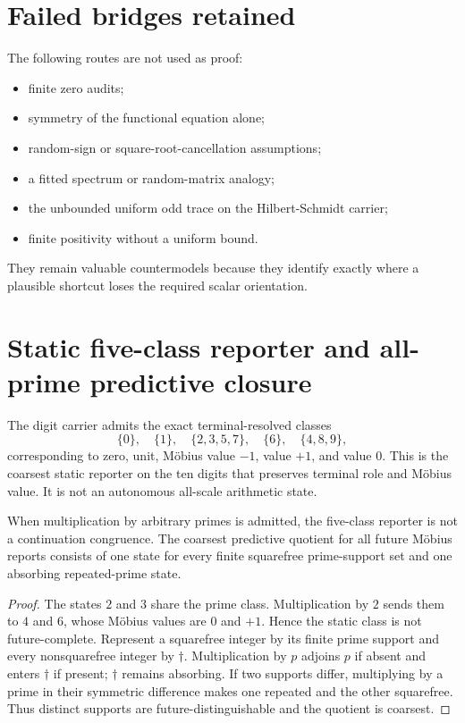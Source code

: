 \documentclass[11pt,a4paper]{article}
\begin{document}
\section{Failed bridges retained}
The following routes are not used as proof:
\begin{itemize}
\item finite zero audits;
\item symmetry of the functional equation alone;
\item random-sign or square-root-cancellation assumptions;
\item a fitted spectrum or random-matrix analogy;
\item the unbounded uniform odd trace on the Hilbert-Schmidt carrier;
\item finite positivity without a uniform bound.
\end{itemize}
They remain valuable countermodels because they identify exactly where a plausible shortcut loses the required scalar orientation.

\section{Static five-class reporter and all-prime predictive closure}
The digit carrier admits the exact terminal-resolved classes
\begin{equation}
\{0\},\quad\{1\},\quad\{2,3,5,7\},\quad\{6\},\quad\{4,8,9\},
\end{equation}
corresponding to zero, unit, M\"obius value $-1$, value $+1$, and value $0$. This is the coarsest static reporter on the ten digits that preserves terminal role and M\"obius value. It is not an autonomous all-scale arithmetic state.

\begin{theorem}
When multiplication by arbitrary primes is admitted, the five-class reporter is not a continuation congruence. The coarsest predictive quotient for all future M\"obius reports consists of one state for every finite squarefree prime-support set and one absorbing repeated-prime state.
\end{theorem}
\begin{proof}
The states $2$ and $3$ share the prime class. Multiplication by $2$ sends them to $4$ and $6$, whose M\"obius values are $0$ and $+1$. Hence the static class is not future-complete. Represent a squarefree integer by its finite prime support and every nonsquarefree integer by $\dagger$. Multiplication by $p$ adjoins $p$ if absent and enters $\dagger$ if present; $\dagger$ remains absorbing. If two supports differ, multiplying by a prime in their symmetric difference makes one repeated and the other squarefree. Thus distinct supports are future-distinguishable and the quotient is coarsest.
\end{proof}
\end{document}
